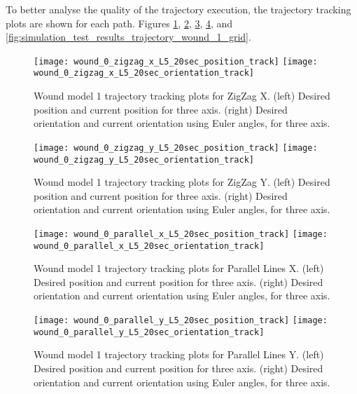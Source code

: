 To better analyse the quality of the trajectory execution, the trajectory tracking plots are shown for each path. Figures  \ref{fig:simulation_test_results_trajectory_wound_1_zigzag_x}, \ref{fig:simulation_test_results_trajectory_wound_1_zigzag_y}, \ref{fig:simulation_test_results_trajectory_wound_1_parallel_x}, \ref{fig:simulation_test_results_trajectory_wound_1_parallel_y}, and \ref{fig:simulation_test_results_trajectory_wound_1_grid}. 

\begin{figure}[htbp]
	\centering
	\texttt{[image: wound\_0\_zigzag\_x\_L5\_20sec\_position\_track]}
	\texttt{[image: wound\_0\_zigzag\_x\_L5\_20sec\_orientation\_track]}
	\caption[Wound model 1 trajectory tracking plots for ZigZag X.]{Wound model 1 trajectory tracking plots for ZigZag X. (left) Desired position and current position for three axis. (right) Desired orientation and current orientation using Euler angles, for three axis.}
    \label{fig:simulation_test_results_trajectory_wound_1_zigzag_x}
\end{figure}

\begin{figure}[htbp]
	\centering
	\texttt{[image: wound\_0\_zigzag\_y\_L5\_20sec\_position\_track]}
	\texttt{[image: wound\_0\_zigzag\_y\_L5\_20sec\_orientation\_track]}
	\caption[Wound model 1 trajectory tracking plots for ZigZag Y.]{Wound model 1 trajectory tracking plots for ZigZag Y. (left) Desired position and current position for three axis. (right) Desired orientation and current orientation using Euler angles, for three axis.}
    \label{fig:simulation_test_results_trajectory_wound_1_zigzag_y}
\end{figure}

\begin{figure}[htbp]
	\centering
	\texttt{[image: wound\_0\_parallel\_x\_L5\_20sec\_position\_track]}
	\texttt{[image: wound\_0\_parallel\_x\_L5\_20sec\_orientation\_track]}
	\caption[Wound model 1 trajectory tracking plots for Parallel Lines X.]{Wound model 1 trajectory tracking plots for Parallel Lines X. (left) Desired position and current position for three axis. (right) Desired orientation and current orientation using Euler angles, for three axis.}
    \label{fig:simulation_test_results_trajectory_wound_1_parallel_x}
\end{figure}

\begin{figure}[htbp]
	\centering
	\texttt{[image: wound\_0\_parallel\_y\_L5\_20sec\_position\_track]}
	\texttt{[image: wound\_0\_parallel\_y\_L5\_20sec\_orientation\_track]}
	\caption[Wound model 1 trajectory tracking plots for Parallel Lines Y.]{Wound model 1 trajectory tracking plots for Parallel Lines Y. (left) Desired position and current position for three axis. (right) Desired orientation and current orientation using Euler angles, for three axis.}
    \label{fig:simulation_test_results_trajectory_wound_1_parallel_y}
\end{figure}


